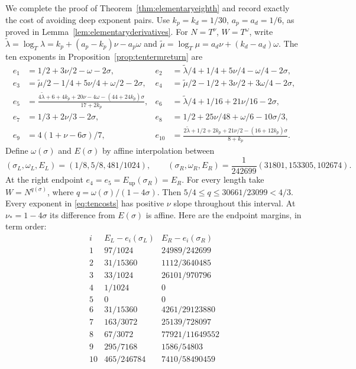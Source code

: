 We complete the proof of Theorem~\ref{thm:elementaryeighth} and
record exactly the cost of avoiding deep exponent pairs.
Use $k_p=k_d=1/30$, $a_p=a_d=1/6$, as proved in
Lemma~\ref{lem:elementaryderivatives}. For $N=T^\nu$, $W=T^\omega$,
write
$\tilde\lambda=\log_T\lambda=k_p+(a_p-k_p)\nu-a_p\omega$ and
$\tilde\mu=\log_T\mu=a_d\nu+(k_d-a_d)\omega$.
The ten exponents in Proposition~\ref{prop:tentermreturn} are
\begin{equation}\label{eq:tencosts}
\begin{aligned}
 e_1&=1/2+3\nu/2-\omega-2\sigma,&
 e_2&=\tilde\lambda/4+1/4+5\nu/4-\omega/4-2\sigma,\\
 e_3&=\tilde\mu/2-1/4+5\nu/4+\omega/2-2\sigma,&
 e_4&=\tilde\mu/2-1/2+3\nu/2+3\omega/4-2\sigma,\\
 e_5&=\frac{4\tilde\lambda+6+4k_p+20\nu-4\omega-(44+24k_p)\sigma}{17+2k_p},&
 e_6&=\tilde\lambda/4+1/16+21\nu/16-2\sigma,\\
 e_7&=1/3+2\nu/3-2\sigma,&
 e_8&=1/2+25\nu/48+\omega/6-10\sigma/3,\\
 e_9&=4(1+\nu-6\sigma)/7,&
 e_{10}&=\frac{2\tilde\lambda+1/2+2k_p+21\nu/2-(16+12k_p)\sigma}{8+k_p}.
\end{aligned}
\end{equation}
Define $\omega(\sigma)$ and $E(\sigma)$ by affine interpolation between
\[
 (\sigma_L,\omega_L,E_L)=(1/8,5/8,481/1024),\qquad
 (\sigma_R,\omega_R,E_R)=\frac1{242699}(31801,153305,102674).
\]
At the right endpoint $e_4=e_5=E_{\mathrm{up}}(\sigma_R)=E_R$.
For every length take $W=N^{q(\sigma)}$, where
$q=\omega(\sigma)/(1-4\sigma)$. Then
$5/4\le q\le30661/23099<4/3$.
Every exponent in \eqref{eq:tencosts} has positive $\nu$ slope
throughout this interval. At $\nu_*=1-4\sigma$ its difference from
$E(\sigma)$ is affine. Here are the endpoint margins, in term order:
\[
\begin{array}{c|cc}
 i&E_L-e_i(\sigma_L)&E_R-e_i(\sigma_R)\\\hline
1&97/1024&24989/242699\\
2&31/15360&1112/3640485\\
3&33/1024&26101/970796\\
4&1/1024&0\\
5&0&0\\
6&31/15360&4261/29123880\\
7&163/3072&25139/728097\\
8&67/3072&77921/11649552\\
9&295/7168&1586/54803\\
10&465/246784&7410/58490459
\end{array}
\]
